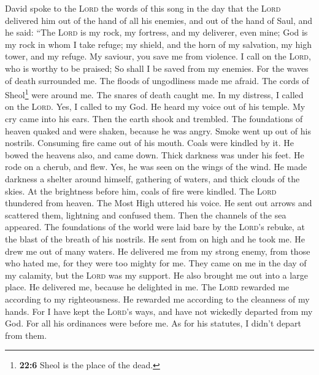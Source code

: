  David spoke to the \textsc{Lord} the words of this song
in the day that the \textsc{Lord} delivered him out of the hand of all
his enemies, and out of the hand of Saul,  and he said:
``The \textsc{Lord} is my rock, my fortress, and my deliverer, even
mine;  God is my rock in whom I take refuge; my shield,
and the horn of my salvation, my high tower, and my refuge. My saviour,
you save me from violence.  I call on the \textsc{Lord},
who is worthy to be praised; So shall I be saved from my enemies.
 For the waves of death surrounded me. The floods of
ungodliness made me afraid.  The cords of Sheol\footnote{\textbf{22:6}
  Sheol is the place of the dead.} were around me. The snares of death
caught me.  In my distress, I called on the \textsc{Lord}.
Yes, I called to my God. He heard my voice out of his temple. My cry
came into his ears.  Then the earth shook and trembled.
The foundations of heaven quaked and were shaken, because he was angry.
 Smoke went up out of his nostrils. Consuming fire came
out of his mouth. Coals were kindled by it.  He bowed the
heavens also, and came down. Thick darkness was under his feet.
 He rode on a cherub, and flew. Yes, he was seen on the
wings of the wind.  He made darkness a shelter around
himself, gathering of waters, and thick clouds of the skies.
 At the brightness before him, coals of fire were
kindled.  The \textsc{Lord} thundered from heaven. The
Most High uttered his voice.  He sent out arrows and
scattered them, lightning and confused them.  Then the
channels of the sea appeared. The foundations of the world were laid
bare by the \textsc{Lord}'s rebuke, at the blast of the breath of his
nostrils.  He sent from on high and he took me. He drew
me out of many waters.  He delivered me from my strong
enemy, from those who hated me, for they were too mighty for me.
 They came on me in the day of my calamity, but the
\textsc{Lord} was my support.  He also brought me out
into a large place. He delivered me, because he delighted in me.
 The \textsc{Lord} rewarded me according to my
righteousness. He rewarded me according to the cleanness of my hands.
 For I have kept the \textsc{Lord}'s ways, and have not
wickedly departed from my God.  For all his ordinances
were before me. As for his statutes, I didn't depart from them.
